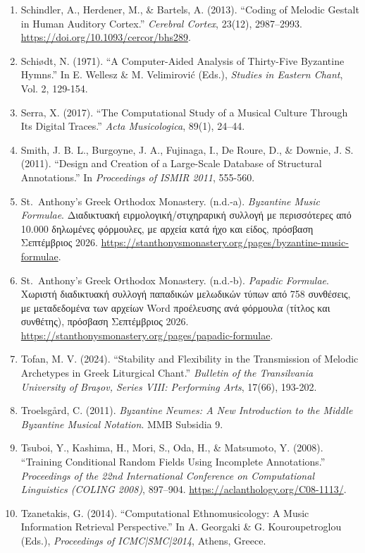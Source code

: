\documentclass[11pt,a4paper]{article}
\begin{document}
\begin{enumerate}
\item
 Schindler, A., Herdener, M., \& Bartels, A. (2013). ``Coding of Melodic Gestalt in Human Auditory Cortex.'' \emph{Cerebral Cortex}, 23(12), 2987--2993. \url{https://doi.org/10.1093/cercor/bhs289}.
\item
 Schiødt, N. (1971). ``A Computer-Aided Analysis of Thirty-Five Byzantine Hymns.'' In E. Wellesz \& M. Velimirović (Eds.), \emph{Studies in Eastern Chant}, Vol. 2, 129-154.
\item
 Serra, X. (2017). ``The Computational Study of a Musical Culture Through Its Digital Traces.'' \emph{Acta Musicologica}, 89(1), 24--44.
\item
 Smith, J. B. L., Burgoyne, J. A., Fujinaga, I., De Roure, D., \& Downie, J. S. (2011). ``Design and Creation of a Large-Scale Database of Structural Annotations.'' In \emph{Proceedings of ISMIR 2011}, 555-560.
\item
 St.~Anthony's Greek Orthodox Monastery. (n.d.-a). \emph{Byzantine Music Formulae}. Διαδικτυακή ειρμολογική/στιχηραρική συλλογή με περισσότερες από 10.000 δηλωμένες φόρμουλες, με αρχεία κατά ήχο και είδος, πρόσβαση Σεπτέμβριος 2026. \url{https://stanthonysmonastery.org/pages/byzantine-music-formulae}.
\item
 St.~Anthony's Greek Orthodox Monastery. (n.d.-b). \emph{Papadic Formulae}. Χωριστή διαδικτυακή συλλογή παπαδικών μελωδικών τύπων από 758 συνθέσεις, με μεταδεδομένα των αρχείων Word προέλευσης ανά φόρμουλα (τίτλος και συνθέτης), πρόσβαση Σεπτέμβριος 2026. \url{https://stanthonysmonastery.org/pages/papadic-formulae}.
\item
 Tofan, M. V. (2024). ``Stability and Flexibility in the Transmission of Melodic Archetypes in Greek Liturgical Chant.'' \emph{Bulletin of the Transilvania University of Braşov, Series VIII: Performing Arts}, 17(66), 193-202.
\item
 Troelsgård, C. (2011). \emph{Byzantine Neumes: A New Introduction to the Middle Byzantine Musical Notation}. MMB Subsidia 9.
\item
 Tsuboi, Y., Kashima, H., Mori, S., Oda, H., \& Matsumoto, Y. (2008). ``Training Conditional Random Fields Using Incomplete Annotations.'' \emph{Proceedings of the 22nd International Conference on Computational Linguistics (COLING 2008)}, 897--904. \url{https://aclanthology.org/C08-1113/}.
\item
 Tzanetakis, G. (2014). ``Computational Ethnomusicology: A Music Information Retrieval Perspective.'' In A. Georgaki \& G. Kouroupetroglou (Eds.), \emph{Proceedings of ICMC|SMC|2014}, Athens, Greece.

\end{enumerate}
\end{document}
